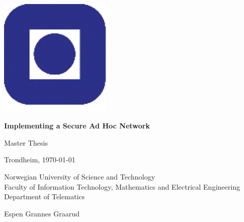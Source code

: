 \begin{titlepage}
 
	\parindent=0cm
	\addtolength{\parskip}{\baselineskip}

	\includegraphics[width=0.4\textwidth]{images/NTNU_logo.png}
	\vspace{2cm}\vspace{0.5cm}
	
	{\Huge \textbf{Implementing a Secure Ad Hoc Network}}

	{\LARGE Master Thesis}
	
	\vspace{1.5cm}	

	\vfill
	
	{\normalsize Trondheim, \today
	
	Norwegian University of Science and Technology\\
	Faculty of Information Technology, Mathematics and Electrical Engineering \\
	Department of Telematics}
	\vspace{2cm}\vspace{0.75cm}

	{\large Espen Grannes Graarud}

\end{titlepage}

